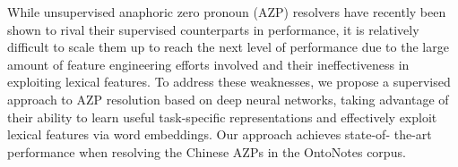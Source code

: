 While unsupervised anaphoric zero pronoun (AZP) resolvers have recently been shown to rival their supervised counterparts in performance, it is relatively difficult to scale them up to reach the next level of performance due to the large amount of feature engineering efforts involved and their ineffectiveness in exploiting lexical features. To address these weaknesses, we propose a supervised approach to AZP resolution based on deep neural networks, taking advantage of their ability to learn useful task-specific representations and effectively exploit lexical features via word embeddings. Our approach achieves state-of- the-art performance when resolving the Chinese AZPs in the OntoNotes corpus.
